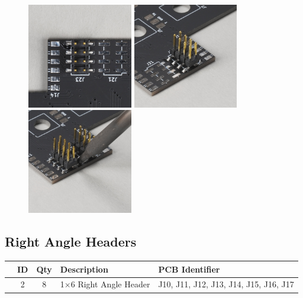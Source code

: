 \documentclass[12pt, a4paper]{article}
\newcommand{\checkbox}[1]{\CheckBox[backgroundcolor=0.86 0.828 0.71, name=#1]{}}
\begin{document}
\begin{figure}[H]
    \centering
    \includegraphics[width=46mm]{images/21_01_header_top_down.jpg}
    \hspace{2mm}
    \includegraphics[width=46mm]{images/21_02_header_sideview.jpg}
    \hspace{2mm}
    \includegraphics[width=46mm]{images/21_03_header_soldering.jpg}
\end{figure}

\pagebreak
\subsection{Right Angle Headers}

\begin{center}
    \small
    \setlength\extrarowheight{8pt}
    \begin{tabularx}{\textwidth}{|c|c|c|X|l|}
        \hline\rowcolor{lightgray} & ID & Qty & Description & PCB Identifier\\
        \hline\checkbox{ga} & 2 & 8 & 1×6 Right Angle Header & J10, J11, J12, J13, J14, J15, J16, J17\\
        \hline
    \end{tabularx}
\end{center}
\end{document}
